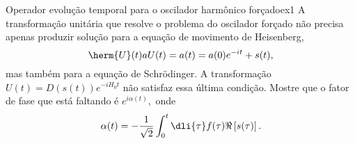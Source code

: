 \begin{exercício}{Operador evolução temporal para o oscilador harmônico forçado}{ex1}
   A transformação unitária que resolve o problema do oscilador forçado não precisa apenas produzir solução para a equação de movimento de Heisenberg,
   \begin{equation*}
      \herm{U}(t) a U(t) = a(t) = a(0) e^{-it} + s(t),
   \end{equation*}
   mas também para a equação de Schrödinger. A transformação \(U(t) = D(s(t)) e^{-i H_0 t}\) não satisfaz essa última condição. Mostre que o fator de fase que está faltando é \(e^{i \alpha(t)},\) onde
   \begin{equation*}
      \alpha(t) = - \frac{1}{\sqrt{2}} \int_0^t \dli{\tau} f(\tau) \Re\left[s(\tau)\right].
   \end{equation*}
\end{exercício}
